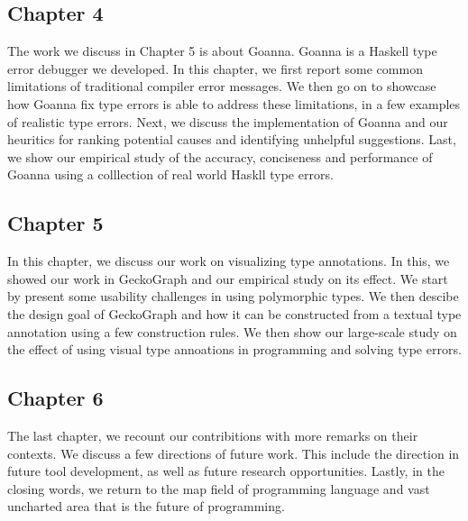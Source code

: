 \subsection{Chapter 4}

The work we discuss in Chapter 5 is about Goanna. Goanna is a Haskell type error debugger we developed. In this chapter, we first report some common limitations of traditional compiler error messages. We then go on to showcase how Goanna fix type errors is able to address these limitations, in a few examples of realistic type errors.  Next, we discuss the implementation of Goanna and our heuritics for ranking potential causes and identifying unhelpful suggestions. Last, we show our empirical study of the accuracy, conciseness and performance of Goanna using a colllection of real world Haskll type errors. 

\subsection{Chapter 5}

In this chapter, we discuss our work on visualizing type annotations. In this, we showed our work in GeckoGraph and our empirical study on its effect. We start by present some usability challenges in using polymorphic types. We then descibe the design goal of GeckoGraph and how it can be constructed from a textual type annotation using a few construction rules. We then show our large-scale study on the effect of using visual type annoations in programming and solving type errors. 


\subsection{Chapter 6}

The last chapter, we recount our contribitions with more remarks on their contexts. We discuss a few directions of future work. This include the direction in future tool development, as well as future research opportunities. Lastly, in the closing words, we return to the map field of programming language and vast uncharted area that is the future of programming. 
